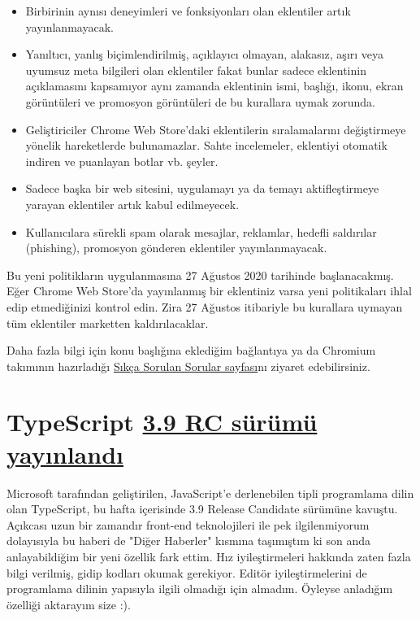 \documentclass[11pt]{article}
\begin{document}
\begin{itemize}
\item Birbirinin aynısı deneyimleri ve fonksiyonları olan eklentiler artık
yayınlanmayacak.
\item Yanıltıcı, yanlış biçimlendirilmiş, açıklayıcı olmayan, alakasız, aşırı
veya uyumsuz meta bilgileri olan eklentiler fakat bunlar sadece eklentinin
açıklamasını kapsamıyor aynı zamanda eklentinin ismi, başlığı, ikonu, ekran
görüntüleri ve promosyon görüntüleri de bu kurallara uymak zorunda.
\item Geliştiriciler Chrome Web Store'daki eklentilerin sıralamalarını
değiştirmeye yönelik hareketlerde bulunamazlar. Sahte incelemeler,
eklentiyi otomatik indiren ve puanlayan botlar vb. şeyler.
\item Sadece başka bir web sitesini, uygulamayı ya da temayı aktifleştirmeye
yarayan eklentiler artık kabul edilmeyecek.
\item Kullanıcılara sürekli spam olarak mesajlar, reklamlar, hedefli saldırılar
(phishing), promosyon gönderen eklentiler yayınlanmayacak.
\end{itemize}

Bu yeni politikların uygulanmasına 27 Ağustos 2020 tarihinde başlanacakmış.
Eğer Chrome Web Store'da yayınlanmış bir eklentiniz varsa yeni politikaları
ihlal edip etmediğinizi kontrol edin. Zira 27 Ağustos itibariyle bu kurallara
uymayan tüm eklentiler marketten kaldırılacaklar.

Daha fazla bilgi için konu başlığına eklediğim bağlantıya ya da Chromium
takımının hazırladığı \href{https://developer.chrome.com/webstore/spam-faq}{Sıkça Sorulan Sorular sayfası}nı ziyaret edebilirsiniz.
\section{TypeScript \href{https://devblogs.microsoft.com/typescript/announcing-typescript-3-9-rc/}{3.9 RC sürümü yayınlandı}}
\label{sec:orge1250c7}
Microsoft tarafından geliştirilen, JavaScript'e derlenebilen tipli programlama
dilin olan TypeScript, bu hafta içerisinde 3.9 Release Candidate sürümüne
kavuştu. Açıkcası uzun bir zamandır front-end teknolojileri ile pek
ilgilenmiyorum dolayısıyla bu haberi de "Diğer Haberler" kısmına taşımıştım ki
son anda anlayabildiğim bir yeni özellik fark ettim. Hız iyileştirmeleri
hakkında zaten fazla bilgi verilmiş, gidip kodları okumak gerekiyor. Editör
iyileştirmelerini de programlama dilinin yapısıyla ilgili olmadığı için
almadım. Öyleyse anladığım özelliği aktarayım size :).
\end{document}
